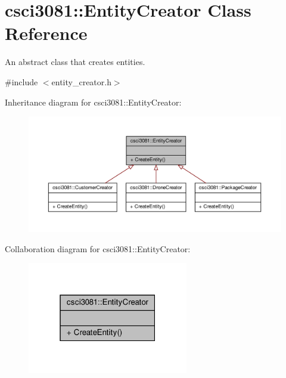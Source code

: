 \hypertarget{classcsci3081_1_1EntityCreator}{}\section{csci3081\+:\+:Entity\+Creator Class Reference}
\label{classcsci3081_1_1EntityCreator}


An abstract class that creates entities.  




{\ttfamily \#include $<$entity\+\_\+creator.\+h$>$}



Inheritance diagram for csci3081\+:\+:Entity\+Creator\+:\nopagebreak
\begin{figure}[H]
\begin{center}
\leavevmode
\includegraphics[width=350pt]{classcsci3081_1_1EntityCreator__inherit__graph}
\end{center}
\end{figure}


Collaboration diagram for csci3081\+:\+:Entity\+Creator\+:\nopagebreak
\begin{figure}[H]
\begin{center}
\leavevmode
\includegraphics[width=199pt]{classcsci3081_1_1EntityCreator__coll__graph}
\end{center}
\end{figure}
